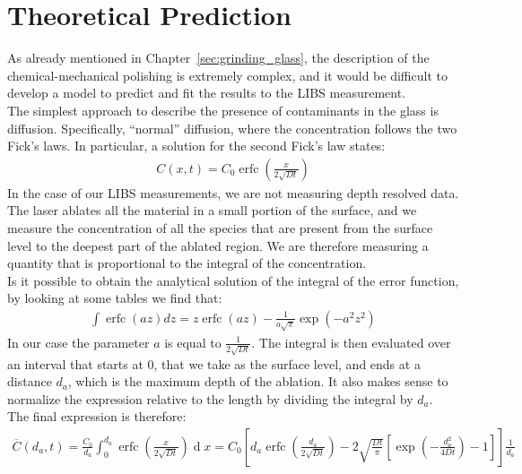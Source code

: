 \section{Theoretical Prediction}
\label{sec:theoretical_prediction}
As already mentioned in Chapter~\ref{sec:grinding_glass}, the description of the chemical-mechanical polishing is extremely complex, and it would be difficult to develop a model to predict and fit the results to the LIBS measurement.
\\
The simplest approach to describe the presence of contaminants in the glass is diffusion. Specifically, “normal” diffusion, where the concentration follows the two Fick’s laws. In particular, a solution for the second Fick’s law states:
\begin{align}
    C\left(x,t\right)=C_0\operatorname{erfc}\left(\frac{x}{2\sqrt{Dt}}\right) \label{eq:second_fick}
\end{align}
In the case of our LIBS measurements, we are not measuring depth resolved data. The laser ablates all the material in a small portion of the surface, and we measure the concentration of all the species that are present from the surface level to the deepest part of the ablated region. We are therefore measuring a quantity that is proportional to the integral of the concentration.
\\
Is it possible to obtain the analytical solution of the integral of the error function, by looking at some tables we find that:
\begin{align}
    \int\operatorname{erfc}\left(az\right)dz=z\operatorname{erfc}\left(az\right)-\frac{1}{a\sqrt\pi}\exp{\left(-a^2z^2\right)} \label{eq:integral_erfc}
\end{align}
In our case the parameter $a$ is equal to $\frac{1}{2\sqrt{Dt}}$. The integral is then evaluated over an interval that starts at 0, that we take as the surface level, and ends at a distance $d_a$, which is the maximum depth of the ablation. It also makes sense to normalize the expression relative to the length by dividing the integral by $d_a$.
\\
The final expression is therefore: 
 \begin{align}
    \overline{C}\left(d_{a},t\right)=\frac{C_{0}}{d_a}\int_{0}^{d_{a}}\operatorname{erfc}\left(\frac{x}{2\sqrt{Dt}}\right)\operatorname{d}x=C_{0}\left[d_{a}\operatorname{erfc}\left(\frac{d_{a}}{2\sqrt{Dt}}\right)-2\sqrt{\frac{Dt}{\pi}}\left[\exp\left(-\frac{d_{a}^{2}}{4Dt}\right)-1\right]\right]\frac{1}{d_a} \label{eq:c_bar_equation}
 \end{align}
